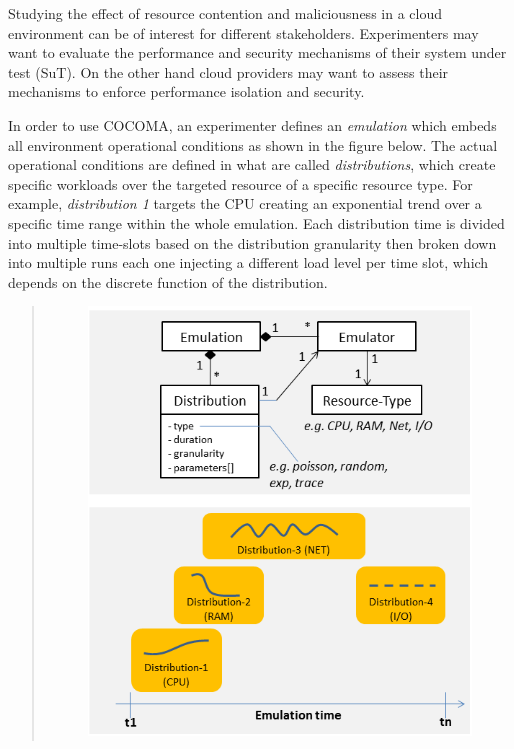 \documentclass[letterpaper,10pt,english]{sphinxhowto}
\begin{document}
Studying the effect of resource contention and maliciousness in a cloud environment can be of interest for different stakeholders. Experimenters may want to evaluate the performance and security mechanisms of their system under test (SuT). On the other hand cloud providers may want to assess their mechanisms to enforce performance isolation and security.

In order to use COCOMA, an experimenter defines an \emph{emulation} which embeds all environment operational conditions as shown in the figure below. The actual operational conditions are defined in what are called \emph{distributions}, which create specific workloads over the targeted resource of a specific resource type. For example, \emph{distribution 1} targets the CPU creating an exponential trend over a specific time range within the whole emulation. Each distribution time is divided into multiple time-slots based on the distribution granularity then broken down into multiple runs each one injecting a different load level per time slot, which depends on the discrete function of the distribution.
\begin{quote}
\begin{figure}[htbp]
\centering

\includegraphics{emulation2.png}
\end{figure}
\end{quote}
\end{document}
